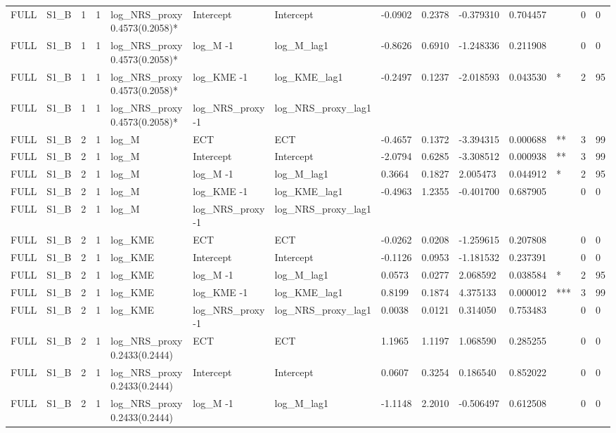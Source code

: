 \begin{tabular}{llllllllllllll}
FULL & S1\_B & 1 & 1 & log\_NRS\_proxy 0.4573(0.2058)* & Intercept & Intercept & -0.0902 & 0.2378 & -0.379310 & 0.704457 &  & 0 & 0 \\
FULL & S1\_B & 1 & 1 & log\_NRS\_proxy 0.4573(0.2058)* & log\_M -1 & log\_M\_lag1 & -0.8626 & 0.6910 & -1.248336 & 0.211908 &  & 0 & 0 \\
FULL & S1\_B & 1 & 1 & log\_NRS\_proxy 0.4573(0.2058)* & log\_KME -1 & log\_KME\_lag1 & -0.2497 & 0.1237 & -2.018593 & 0.043530 & * & 2 & 95 \\
FULL & S1\_B & 1 & 1 & log\_NRS\_proxy 0.4573(0.2058)* & log\_NRS\_proxy -1 & log\_NRS\_proxy\_lag1 &  &  &  &  &  &  &  \\
FULL & S1\_B & 2 & 1 & log\_M & ECT & ECT & -0.4657 & 0.1372 & -3.394315 & 0.000688 & ** & 3 & 99 \\
FULL & S1\_B & 2 & 1 & log\_M & Intercept & Intercept & -2.0794 & 0.6285 & -3.308512 & 0.000938 & ** & 3 & 99 \\
FULL & S1\_B & 2 & 1 & log\_M & log\_M -1 & log\_M\_lag1 & 0.3664 & 0.1827 & 2.005473 & 0.044912 & * & 2 & 95 \\
FULL & S1\_B & 2 & 1 & log\_M & log\_KME -1 & log\_KME\_lag1 & -0.4963 & 1.2355 & -0.401700 & 0.687905 &  & 0 & 0 \\
FULL & S1\_B & 2 & 1 & log\_M & log\_NRS\_proxy -1 & log\_NRS\_proxy\_lag1 &  &  &  &  &  &  &  \\
FULL & S1\_B & 2 & 1 & log\_KME & ECT & ECT & -0.0262 & 0.0208 & -1.259615 & 0.207808 &  & 0 & 0 \\
FULL & S1\_B & 2 & 1 & log\_KME & Intercept & Intercept & -0.1126 & 0.0953 & -1.181532 & 0.237391 &  & 0 & 0 \\
FULL & S1\_B & 2 & 1 & log\_KME & log\_M -1 & log\_M\_lag1 & 0.0573 & 0.0277 & 2.068592 & 0.038584 & * & 2 & 95 \\
FULL & S1\_B & 2 & 1 & log\_KME & log\_KME -1 & log\_KME\_lag1 & 0.8199 & 0.1874 & 4.375133 & 0.000012 & *** & 3 & 99 \\
FULL & S1\_B & 2 & 1 & log\_KME & log\_NRS\_proxy -1 & log\_NRS\_proxy\_lag1 & 0.0038 & 0.0121 & 0.314050 & 0.753483 &  & 0 & 0 \\
FULL & S1\_B & 2 & 1 & log\_NRS\_proxy 0.2433(0.2444) & ECT & ECT & 1.1965 & 1.1197 & 1.068590 & 0.285255 &  & 0 & 0 \\
FULL & S1\_B & 2 & 1 & log\_NRS\_proxy 0.2433(0.2444) & Intercept & Intercept & 0.0607 & 0.3254 & 0.186540 & 0.852022 &  & 0 & 0 \\
FULL & S1\_B & 2 & 1 & log\_NRS\_proxy 0.2433(0.2444) & log\_M -1 & log\_M\_lag1 & -1.1148 & 2.2010 & -0.506497 & 0.612508 &  & 0 & 0 \\

\end{tabular}
